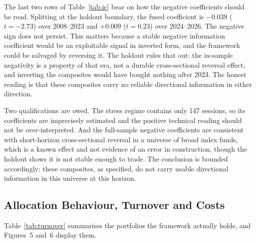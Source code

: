 The last two rows of Table~\ref{tab:ic} bear on how the negative coefficients should be
read. Splitting at the holdout boundary, the fused coefficient is $-0.039$ ($t = -2.73$)
over 2008--2023 and $+0.009$ ($t = 0.23$) over 2024--2026. The negative sign does not
persist. This matters because a stable negative information coefficient would be an
exploitable signal in inverted form, and the framework could be salvaged by reversing it.
The holdout rules that out: the in-sample negativity is a property of that era, not a
durable cross-sectional reversal effect, and inverting the composites would have bought
nothing after 2023. The honest reading is that these composites carry no reliable
directional information in either direction.

Two qualifications are owed. The stress regime contains only 147 sessions, so its
coefficients are imprecisely estimated and the positive technical reading should not be
over-interpreted. And the full-sample negative coefficients are consistent with
short-horizon cross-sectional reversal in a universe of broad index funds, which is a
known effect and not evidence of an error in construction, though the holdout shows it is
not stable enough to trade. The conclusion is bounded accordingly: these composites, as
specified, do not carry usable directional information in this universe at this
horizon.

\subsection{Allocation Behaviour, Turnover and Costs}
\label{sec:alloc}
\label{sec:cost}

Table~\ref{tab:turnover} summarises the portfolios the framework actually holds, and Figures~5 and~6
display them.

